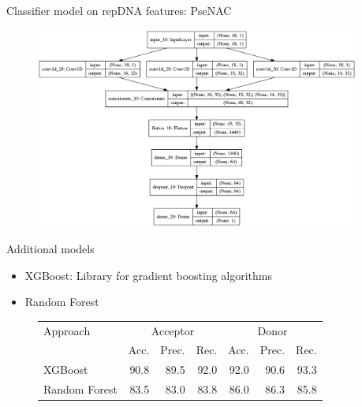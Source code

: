 \documentclass[10pt]{beamer}
\begin{document}
\begin{frame}{Classifier model on repDNA features: PseNAC}
	\begin{figure}[ht]
		\centering
		\includegraphics[width = 0.95\textwidth]{../../models/plotted_models/PC_PseDNC_model.png}
	\end{figure}
\end{frame}

\begin{frame}{Additional models}
	\begin{itemize}
		\item XGBoost: Library for gradient boosting algorithms
		\item Random Forest
	\end{itemize}
	\pause
	\begin{figure}
		\small
		\centering
		\begingroup
		\def\arraystretch{1.2}
		\begin{tabular}{|l|r|r|r|r|r|r|}
			\hline
			Approach  & \multicolumn{3}{c|}{Acceptor} & \multicolumn{3}{c|}{Donor} \\
			\cline{2-7}
			 & Acc. & Prec. & Rec. & Acc. & Prec. & Rec. \\
			\hline
			XGBoost  & 90.8 & 89.5 & 92.0 & 92.0 & 90.6 & 93.3 \\
			Random Forest & 83.5 & 83.0 & 83.8 & 86.0 & 86.3 & 85.8\\
			\hline  
		\end{tabular}
		\endgroup
	\end{figure}
\end{frame}
\end{document}
